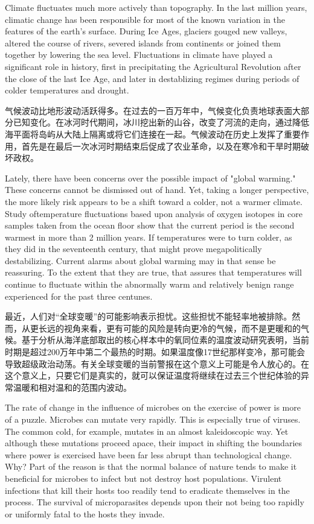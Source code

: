 \begin{paracol}{2}
\switchcolumn*
Climate fluctuates much more actively than topography. In the last million years, climatic change has been responsible for most of the known variation in the features of the earth's surface. During Ice Ages, glaciers gouged new valleys, altered the course of rivers, severed islands from continents or joined them together by lowering the sea level. Fluctuations in climate have played a significant role in history, first in precipitating the Agricultural Revolution after the close of the last Ice Age, and later in destablizing regimes during periods of colder temperatures and drought. 

\switchcolumn
气候波动比地形波动活跃得多。在过去的一百万年中，气候变化负责地球表面大部分已知变化。在冰河时代期间，冰川挖出新的山谷，改变了河流的走向，通过降低海平面将岛屿从大陆上隔离或将它们连接在一起。气候波动在历史上发挥了重要作用，首先是在最后一次冰河时期结束后促成了农业革命，以及在寒冷和干旱时期破坏政权。

\switchcolumn*
Lately, there have been concerns over the possible impact of "global warming." These concerns cannot be dismissed out of hand. Yet, taking a longer perspective, the more likely risk appears to be a shift toward a colder, not a warmer climate. Study oftemperature fluctuations based upon analysis of oxygen isotopes in core samples taken from the ocean floor show that the current period is the second warmest in more than 2 million years. If temperatures were to turn colder, as they did in the seventeenth century, that might prove megapolitically destabilizing. Current alarms about global warming may in that sense be reassuring. To the extent that they are true, that assures that temperatures will continue to fluctuate within the abnormally warm and relatively benign range experienced for the past three centunes.

\switchcolumn
最近，人们对“全球变暖”的可能影响表示担忧。这些担忧不能轻率地被排除。然而，从更长远的视角来看，更有可能的风险是转向更冷的气候，而不是更暖和的气候。基于分析从海洋底部取出的核心样本中的氧同位素的温度波动研究表明，当前时期是超过200万年中第二个最热的时期。如果温度像17世纪那样变冷，那可能会导致超级政治动荡。有关全球变暖的当前警报在这个意义上可能是令人放心的。在这个意义上，只要它们是真实的，就可以保证温度将继续在过去三个世纪体验的异常温暖和相对温和的范围内波动。

\switchcolumn*
The rate of change in the influence of microbes on the exercise of power is more of a puzzle. Microbes can mutate very rapidly. This is especially true of viruses. The common cold, for example, mutates in an almost kaleidoscopic way. Yet although these mutations proceed apace, their impact in shifting the boundaries where power is exercised have been far less abrupt than technological change. Why? Part of the reason is that the normal balance of nature tends to make it beneficial for microbes to infect but not destroy host populations. Virulent infections that kill their hosts too readily tend to eradicate themselves in the process. The survival of microparasites depends upon their not being too rapidly or uniformly fatal to the hosts they invade.


\end{paracol}
